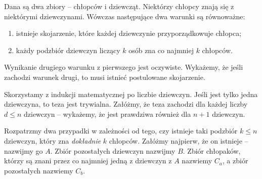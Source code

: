 \newpage


\noindent
Dana są dwa zbiory -- chłopców i dziewcząt. Niektórzy chłopcy znają się z niektórymi dziewczynami. Wówczas następujące dwa warunki są równoważne:
\begin{enumerate}
	\item istnieje skojarzenie, które każdej dziewczynie przyporządkowuje chłopca;
	\item każdy podzbiór dziewczyn liczący $k$ osób zna co najmniej $k$ chłopców.
\end{enumerate}



\vspace{5px}
\noindent
Wynikanie drugiego warunku z pierwszego jest oczywiste. Wykażemy, że jeśli zachodzi warunek drugi, to musi istnieć postulowane skojarzenie.

\vspace{10px}
\noindent
Skorzystamy z indukcji matematycznej po liczbie dziewczyn. Jeśli jest tylko jedna dziewczyna, to teza jest trywialna. Załóżmy, że teza zachodzi dla każdej liczby $d \leqslant n$ dziewczyn -- wykażemy, że jest prawdziwa również dla $n + 1$ dziewczyn.

\vspace{10px}
\noindent
Rozpatrzmy dwa przypadki w zależności od tego, czy istnieje taki podzbiór $k \leqslant n$ dziewczyn, który zna \textit{dokładnie} $k$ chłopców. Załóżmy najpierw, że on istnieje -- nazwijmy go $A$. Zbiór pozostałych dziewczyn nazwijmy $B$. Zbiór chłopaków, którzy są znani przez co najmniej jedną z dziewczyn z $A$ nazwiemy $C_a$, a zbiór pozostałych nazwiemy $C_b$.

\begin{center}
\end{center}

